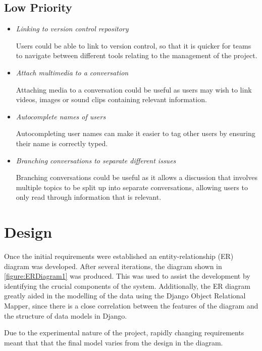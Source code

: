 \documentclass[a4paper]{l3proj}
\begin{document}
\subsection{Low Priority}
\begin{itemize}
\item \textit{Linking to version control repository} \par
Users could be able to link to version control, so that it is quicker for teams to navigate between different tools relating to the management of the project.

\item \textit{Attach multimedia to a conversation} \par
Attaching media to a conversation could be useful as users may wish to link videos, images or sound clips containing relevant information.

\item \textit{Autocomplete names of users} \par
Autocompleting user names can make it easier to tag other users by ensuring their name is correctly typed.

\item \textit{Branching conversations to separate different issues} \par
Branching conversations could be useful as it allows a discussion that involves multiple topics to be split up into separate conversations, allowing users to only read through information that is relevant.

\end{itemize}

\fi


\section{Design}
\label{design}

Once the initial requirements were established an entity-relationship (ER) diagram was developed. After several iterations, the diagram shown in \autoref{figure:ERDiagram1} was produced. This was used to assist the development by identifying the crucial components of the system. Additionally, the ER diagram greatly aided in the modelling of the data using the Django Object Relational Mapper, since there is a close correlation between the features of the diagram and the structure of data models in Django.

Due to the experimental nature of the project, rapidly changing requirements meant that that the final model varies from the design in the diagram.
\end{document}
